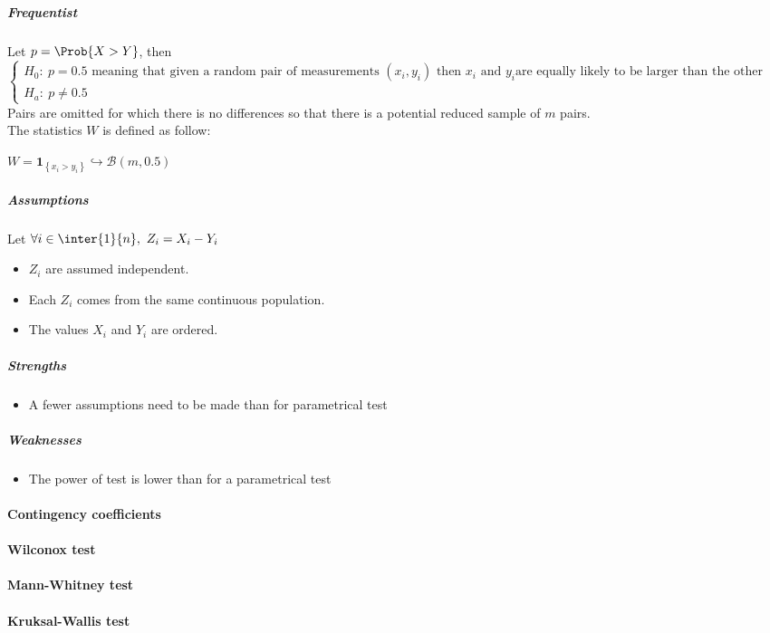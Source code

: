 \subparagraph{Frequentist}
Let $p=\Prob{X>Y}$, then
$\begin{cases}
    H_{0}:~p=0.5\text{ meaning that given a random pair of measurements }(x_{i}, y_{i})
    \text{ then }x_{i}\text{ and }y_{i}\text{are equally likely to be larger than the
    other}\\
    H_{a}:~p\neq 0.5
\end{cases}$
Pairs are omitted for which there is no differences so that there is a potential reduced
sample of $m$ pairs.\\
The statistics $W$ is defined as follow:
\begin{center}
    $W = \mathbf{1}_{\left\{x_{i} > y_{i}\right\}} \hookrightarrow \mathcal{B}(m, 0.5)$
\end{center}

\subparagraph{Assumptions}
Let $\forall i\in\inter{1}{n},~Z_{i} = X_{i} - Y_{i}$

\begin{itemize}
    \item $Z_{i}$ are assumed independent.
    \item Each $Z_{i}$ comes from the same continuous population.
    \item The values $X_{i}$ and $Y_{i}$ are ordered.
\end{itemize}

\subparagraph{Strengths}
\begin{itemize}
    \item A fewer assumptions need to be made than for parametrical test
\end{itemize}

\subparagraph{Weaknesses}
\begin{itemize}
    \item The power of test is lower than for a parametrical test
\end{itemize}



\paragraph{Contingency coefficients}
\paragraph{Wilconox test}
\paragraph{Mann-Whitney test}
\paragraph{Kruksal-Wallis test}
